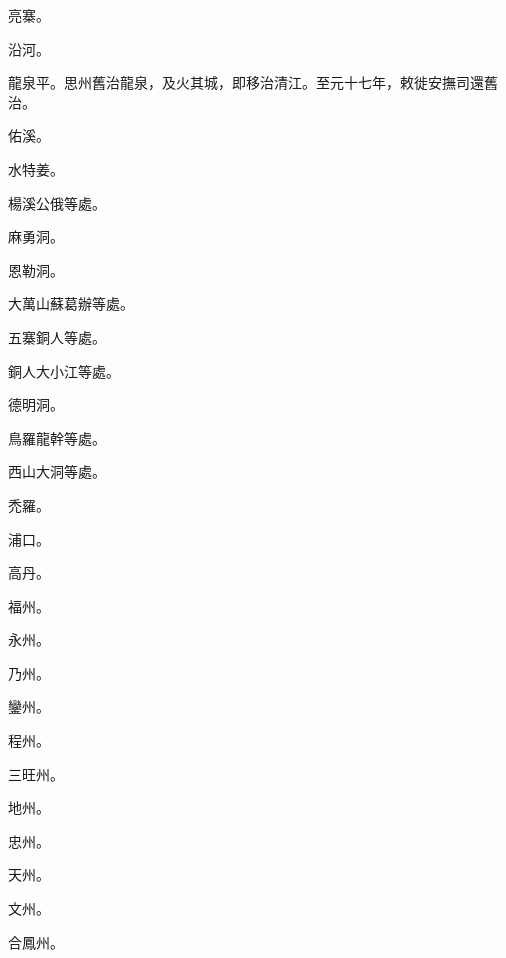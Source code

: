 \begin{pinyinscope}
 亮寨。



 沿河。



 龍泉平。思州舊治龍泉，及火其城，即移治清江。至元十七年，敕徙安撫司還舊治。



 佑溪。



 水特姜。



 楊溪公俄等處。



 麻勇洞。



 恩勒洞。



 大萬山蘇葛辦等處。



 五寨銅人等處。



 銅人大小江等處。



 德明洞。



 鳥羅龍幹等處。



 西山大洞等處。



 禿羅。



 浦口。



 高丹。



 福州。



 永州。



 乃州。



 鑾州。



 程州。



 三旺州。



 地州。



 忠州。



 天州。



 文州。



 合鳳州。




\end{pinyinscope}
